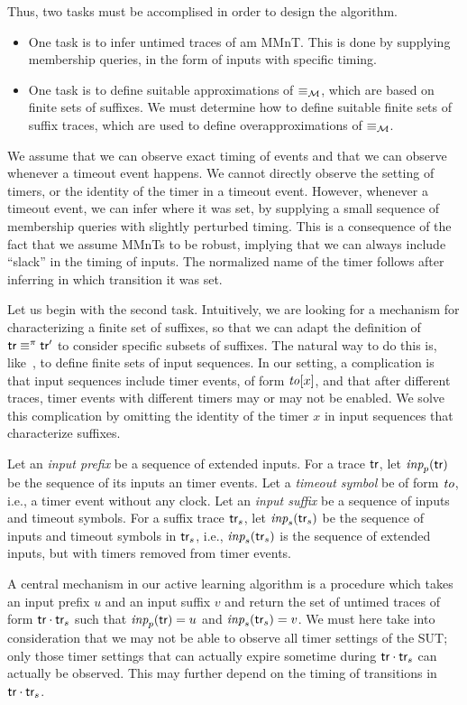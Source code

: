 Thus, two tasks must be accomplised in order to design the algorithm.
\begin{itemize}
  \item
    One task is to infer untimed traces of am MMnT.
    This is done by supplying membership queries, in the form of inputs
    with specific timing.
\item
  One task is to define suitable approximations of $\equiv_{\cal M}$, which are
  based on finite sets of suffixes. We must determine how to define suitable
  finite sets of suffix traces, which are used to define overapproximations
  of $\equiv_{\cal M}$.
\end{itemize}
We assume that we can observe
exact timing of events and that we can observe whenever a timeout event
happens. We cannot directly observe the setting of timers, or the identity
of the timer in a timeout event. However, whenever a timeout event, we
can infer where it was set, by supplying a small sequence of membership queries
with slightly perturbed timing. This is a consequence of the fact that we
assume MMnTs to be robust, implying that we can always include ``slack'' in
the timing of inputs. The normalized name of the timer follows after inferring
in which transition it was set.

Let us begin with the second task.
Intuitively, we are looking for a mechanism for characterizing a finite
set of suffixes, so that we can adapt the definition of
$\textsf{tr} \equiv^{\pi} \textsf{tr}'$ to consider specific subsets of
suffixes. The natural way to do this is, like~\cite{Nie03}, to define
finite sets of input sequences. In our setting, a complication is that
input sequences include timer events, of form $\mathit{to}[x]$, and that
after different traces, timer events with different timers may or may
not be enabled. We solve this complication by omitting the
identity of the timer $x$ in input sequences that characterize suffixes.

Let an \emph{input prefix} be a sequence of extended inputs.
For a trace $\textsf{tr}$, let $\textit{inp}_p(\textsf{tr})$ be the sequence of its
inputs an timer events.
Let a \emph{timeout symbol} be of form $\mathit{to}$, i.e., a
timer event without any clock.
Let an \emph{input suffix} be a sequence of inputs and timeout symbols.
For a suffix trace $\textsf{tr}_s$, let $\textit{inp}_s(\textsf{tr}_s)$ be the sequence
of inputs and timeout symbols in $\textsf{tr}_s$, i.e., $\textit{inp}_s(\textsf{tr}_s)$ is the
sequence of extended inputs, but with timers removed from timer events.

A central mechanism in our active learning algorithm is a procedure which
takes  an input prefix $u$ and an input suffix $v$ and return the set of
untimed traces of form $\textsf{tr}\cdot\textsf{tr}_s$ such that
$\textit{inp}_p(\textsf{tr}) = u$ and $\textit{inp}_s(\textsf{tr}_s) = v$. We must here take into
consideration that we may not be able to observe all timer settings of the
SUT; only those timer settings that can actually expire sometime during
$\textsf{tr}\cdot\textsf{tr}_s$ can actually be observed.
This may further depend on the timing of transitions
in $\textsf{tr}\cdot\textsf{tr}_s$.

